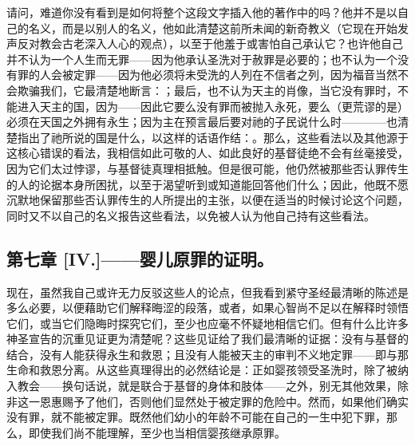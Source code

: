 请问，难道你没有看到是如何将整个这段文字插入他的著作中的吗？他并不是以自己的名义，而是以别人的名义，他如此清楚这前所未闻的新奇教义（它现在开始发声反对教会古老深入人心的观点），以至于他羞于或害怕自己承认它？也许他自己并不认为一个人生而无罪——因为他承认圣洗对于赦罪是必要的；也不认为一个没有罪的人会被定罪——因为他必须将未受洗的人列在不信者之列，因为福音当然不会欺骗我们，它最清楚地断言：；最后，也不认为天主的肖像，当它没有罪时，不能进入天主的国，因为——因此它要么没有罪而被抛入永死，要么（更荒谬的是）必须在天国之外拥有永生；因为主在预言最后要对祂的子民说什么时————也清楚指出了祂所说的国是什么，以这样的话语作结：。那么，这些看法以及其他源于这核心错误的看法，我相信如此可敬的人、如此良好的基督徒绝不会有丝毫接受，因为它们太过悖谬，与基督徒真理相抵触。但是很可能，他仍然被那些否认罪传生的人的论据本身所困扰，以至于渴望听到或知道能回答他们什么；因此，他既不愿沉默地保留那些否认罪传生的人所提出的主张，以便在适当的时候讨论这个问题，同时又不以自己的名义报告这些看法，以免被人认为他自己持有这些看法。\par


\subsection{第七章 [IV.]——婴儿原罪的证明。}

现在，虽然我自己或许无力反驳这些人的论点，但我看到紧守圣经最清晰的陈述是多么必要，以便藉助它们解释晦涩的段落，或者，如果心智尚不足以在解释时领悟它们，或当它们隐晦时探究它们，至少也应毫不怀疑地相信它们。但有什么比许多神圣宣告的沉重见证更为清楚呢？这些见证给了我们最清晰的证据：没有与基督的结合，没有人能获得永生和救恩；且没有人能被天主的审判不义地定罪——即与那生命和救恩分离。从这些真理得出的必然结论是：正如婴孩领受圣洗时，除了被纳入教会——换句话说，就是联合于基督的身体和肢体——之外，别无其他效果，除非这一恩惠赐予了他们，否则他们显然处于被定罪的危险中。然而，如果他们确实没有罪，就不能被定罪。既然他们幼小的年龄不可能在自己的一生中犯下罪，那么，即使我们尚不能理解，至少也当相信婴孩继承原罪。\par


